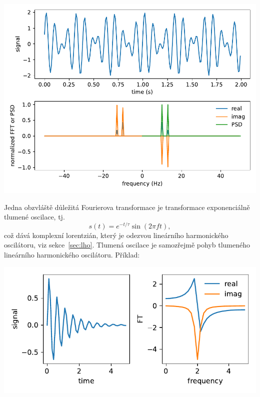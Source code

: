 
\begin{center}
    \includegraphics[width=0.5\linewidth]{fouriers.pdf}
\end{center}



Jedna obzvláště důležitá Fourierova transformace je transformace exponenciálně tlumené oscilace, tj.
\begin{equation}
    s(t) = e^{-t/\tau}\sin(2\pi f t),
\end{equation}
což dává komplexní lorentzián, který je odezvou lineárního harmonického oscilátoru, viz sekce~\ref{sec:lho}. Tlumená oscilace je samozřejmě pohyb tlumeného lineárního harmonického oscilátoru. Příklad:

\begin{center}
    \includegraphics{decaying_exponential.pdf}
\end{center}

